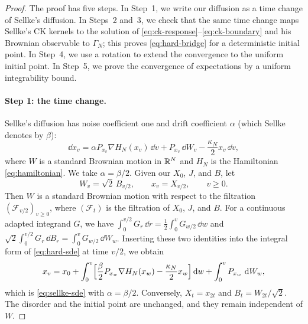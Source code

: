 \begin{proof}
The proof has five steps. In Step~1, we write our diffusion as a time change of Sellke's diffusion. In Steps~2 and~3, we check that the same time change maps Sellke's CK kernels to the solution of \eqref{eq:ck-response}--\eqref{eq:ck-boundary} and his Brownian observable to $\Gamma_N$; this proves \eqref{eq:hard-bridge} for a deterministic initial point. In Step~4, we use a rotation to extend the convergence to the uniform initial point. In Step~5, we prove the convergence of expectations by a uniform integrability bound.

\paragraph{Step 1: the time change.}
Sellke's diffusion \cite[arXiv version~5, Equation~(1.2), p.~2]{sellke2024} has noise coefficient one and drift coefficient $\alpha$ (which Sellke denotes by $\beta$):
\begin{equation}\label{eq:sellke-sde}
 \dd x_v=\alpha P_{x_v}\nabla H_N(x_v)\,\dd v+P_{x_v}\,\dd W_v-\frac{\kappa_N}2x_v\,\dd v,
\end{equation}
where $W$ is a standard Brownian motion in $\mathbb R^N$ and $H_N$ is the Hamiltonian \eqref{eq:hamiltonian}. We take $\alpha=\beta/2$. Given our $X_0$, $J$, and $B$, let
\[
 W_v=\sqrt2\,B_{v/2},\qquad x_v=X_{v/2},\qquad v\ge0.
\]
Then $W$ is a standard Brownian motion with respect to the filtration $(\mathcal F_{v/2})_{v\ge0}$, where $(\mathcal F_t)$ is the filtration of $X_0$, $J$, and $B$. For a continuous adapted integrand $G$, we have $\int_0^{v/2}G_r\,\dd r=\frac12\int_0^vG_{w/2}\,\dd w$ and $\sqrt2\int_0^{v/2}G_r\,\dd B_r=\int_0^vG_{w/2}\,\dd W_w$. Inserting these two identities into the integral form of \eqref{eq:hard-sde} at time $v/2$, we obtain
\[
 x_v=x_0+\int_0^v\Bigl[\frac\beta2P_{x_w}\nabla H_N(x_w)-\frac{\kappa_N}2x_w\Bigr]\mathop{}\!\mathrm d w
 +\int_0^vP_{x_w}\,\mathop{}\!\mathrm d W_w,
\]
which is \eqref{eq:sellke-sde} with $\alpha=\beta/2$. Conversely, $X_t=x_{2t}$ and $B_t=W_{2t}/\sqrt2$. The disorder and the initial point are unchanged, and they remain independent of $W$.


\end{proof}

